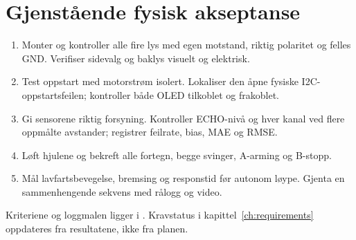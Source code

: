 \section{Gjenstående fysisk akseptanse}
\begin{enumerate}
\item Monter og kontroller alle fire lys med egen motstand, riktig polaritet
og felles GND. Verifiser sidevalg og baklys visuelt og elektrisk.
\item Test oppstart med motorstrøm isolert. Lokaliser den åpne fysiske
I2C-oppstartsfeilen; kontroller både OLED tilkoblet og frakoblet.
\item Gi sensorene riktig forsyning. Kontroller ECHO-nivå og hver kanal ved
flere oppmålte avstander; registrer feilrate, bias, MAE og RMSE.
\item Løft hjulene og bekreft alle fortegn, begge svinger, A-arming og B-stopp.
\item Mål lavfartsbevegelse, bremsing og responstid før autonom løype.
Gjenta en sammenhengende sekvens med rålogg og video.
\end{enumerate}
Kriteriene og loggmalen ligger i . Kravstatus i
kapittel~\ref{ch:requirements} oppdateres fra resultatene, ikke fra planen.
